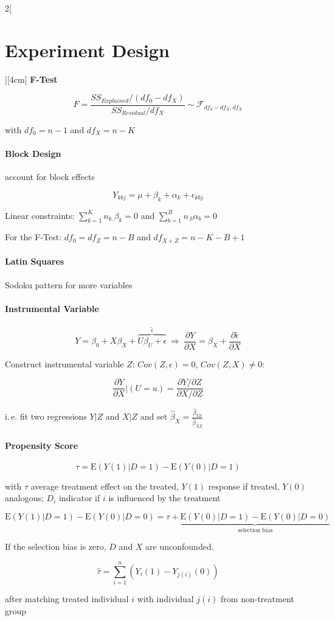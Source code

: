 \documentclass[8pt]{extarticle}
\begin{document}
\begin{multicols}{2}[\section{Experiment Design}][4cm]
\textbf{F-Test}

$$F=\frac{SS_{Explained}/(df_0 {-} df_X)}{SS_{Residual}/df_X} \sim \mathcal{F}_{df_0{-}df_X,df_X}$$

with $df_0 = n{-}1$ and $df_X=n{-}K$


\paragraph{Block Design} account for block effects

$$Y_{kbj} = \mu+ \beta_k +\alpha_k+\epsilon_{kbj}$$

\noindent Linear constraints: $\sum_{k=1}^K n_{k.} \beta_k = 0$ and $\sum_{b=1}^B n_{.b} \alpha_b = 0$ 

For the F-Test: $df_0 = df_Z = n{-}B$ and $df_{X+Z}=n{-}K{-}B{+}1$

\paragraph{Latin Squares} Sodoku pattern for more variables

\paragraph{Instrumental Variable}

$$Y = \beta_0 + X\beta_X + \overbrace{U\beta_U + \epsilon}^{\tilde{\epsilon}} \ \Rightarrow\  \frac{\partial Y}{\partial X} = \beta_X + \frac{\partial \tilde{\epsilon}}{\partial X}$$

\noindent Construct instrumental variable $Z$: $Cov(Z,\epsilon){=}0$, $Cov(Z,X){\neq}0$:

$$\frac{\partial Y}{\partial X}|(U{=}u) = \frac{\partial Y / \partial Z}{\partial X/ \partial Z}$$

i.\,e. fit two regressions $Y|Z$ and $X|Z$ and set $\hat{\beta}_X = \frac{\hat{\beta}_{YZ}}{\hat{\beta}_{XZ}}$

\paragraph{Propensity Score} 

$$\tau = \mathrm{E}(Y(1)|D{=}1) - \mathrm{E}(Y(0)|D{=}1)$$

\noindent with $\tau$ average treatment effect on the treated, $Y(1)$ response if treated, $Y(0)$ analogous; $D_i$ indicator if $i$ is influenced by the treatment 

$$\mathrm{E}(Y(1)|D{=}1) - \mathrm{E}(Y(0)|D{=}0) = \tau + \underbrace{\mathrm{E}(Y(0)|D{=}1) - \mathrm{E}(Y(0)|D{=}0)}_{\text{selection bias}}$$

If the selection bias is zero, $D$ and $X$ are unconfounded.

$$\hat{\tau} = \sum_{i=1}^n (Y_i(1) -Y_{j(i)}(0))$$

\noindent after matching treated individual $i$ with individual $j(i)$ from non-treatment group




\end{multicols}
\end{document}
